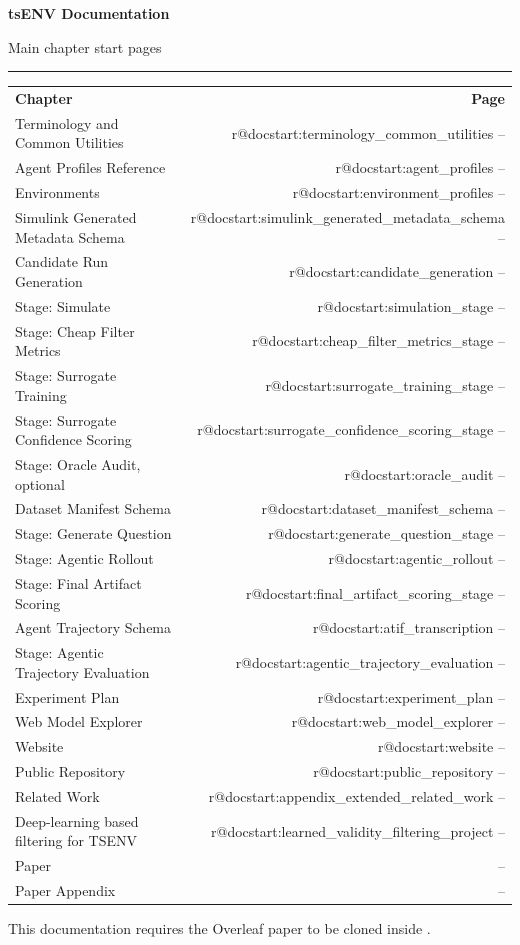 \documentclass[11pt]{article}
\begin{document}
\suppressManualDocCenteredTitle
{}
\providecommand{\manualDocPaperStartPage}{--}
\providecommand{\manualDocPaperAppendixStartPage}{--}
\newcommand{\chapterstartpage}[1]{%
  \ifcsname r@#1\endcsname
    \pageref{#1}%
  \else
    --%
  \fi
}
\newcommand{\indexrow}[2]{%
  #1 & \chapterstartpage{#2} \\[0.32em]
}
\newcommand{\indexrowvalue}[2]{%
  #1 & #2 \\[0.32em]
}

\vspace{0.25em}
{\fontsize{24}{28}\selectfont\bfseries tsENV Documentation\par}
\vspace{0.35em}
{\large Main chapter start pages\par}
\vspace{0.6em}
\noindent\rule{\textwidth}{0.6pt}
\vspace{0.8em}

\begingroup
\setlength{\tabcolsep}{0pt}
\renewcommand{\arraystretch}{0.96}

{\normalsize
\begin{tabular*}{\textwidth}{@{\extracolsep{\fill}}lr@{}}
\textbf{Chapter} & \textbf{Page} \\[0.45em]
\indexrow{Terminology and Common Utilities}{docstart:terminology_common_utilities}
\indexrow{Agent Profiles Reference}{docstart:agent_profiles}
\indexrow{Environments}{docstart:environment_profiles}
\indexrow{Simulink Generated Metadata Schema}{docstart:simulink_generated_metadata_schema}
\indexrow{Candidate Run Generation}{docstart:candidate_generation}
\indexrow{Stage: Simulate}{docstart:simulation_stage}
\indexrow{Stage: Cheap Filter Metrics}{docstart:cheap_filter_metrics_stage}
\indexrow{Stage: Surrogate Training}{docstart:surrogate_training_stage}
\indexrow{Stage: Surrogate Confidence Scoring}{docstart:surrogate_confidence_scoring_stage}
\indexrow{Stage: Oracle Audit, optional}{docstart:oracle_audit}
\indexrow{Dataset Manifest Schema}{docstart:dataset_manifest_schema}
\indexrow{Stage: Generate Question}{docstart:generate_question_stage}
\indexrow{Stage: Agentic Rollout}{docstart:agentic_rollout}
\indexrow{Stage: Final Artifact Scoring}{docstart:final_artifact_scoring_stage}
\indexrow{Agent Trajectory Schema}{docstart:atif_transcription}
\indexrow{Stage: Agentic Trajectory Evaluation}{docstart:agentic_trajectory_evaluation}
\indexrow{Experiment Plan}{docstart:experiment_plan}
\indexrow{Web Model Explorer}{docstart:web_model_explorer}
\indexrow{Website}{docstart:website}
\indexrow{Public Repository}{docstart:public_repository}
\indexrow{Related Work}{docstart:appendix_extended_related_work}
\indexrow{Deep-learning based filtering for TSENV}{docstart:learned_validity_filtering_project}
\indexrowvalue{Paper}{\manualDocPaperStartPage}
\indexrowvalue{Paper Appendix}{\manualDocPaperAppendixStartPage}
\end{tabular*}
}
\endgroup

\vspace{0.4em}
This documentation requires the Overleaf paper to be cloned inside .
\end{document}
